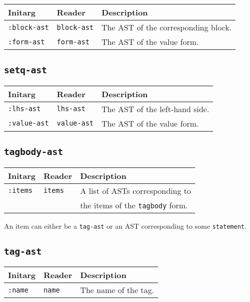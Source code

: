 \begin{tabular}{|l|l|l|}
\hline
Initarg & Reader & Description\\
\hline\hline
\texttt{:block-ast} & \texttt{block-ast} & The AST of the
corresponding block.\\
\hline
\texttt{:form-ast} & \texttt{form-ast} & The AST of the value form.\\
\hline
\end{tabular}

\subsection{\texttt{setq-ast}}
\label{setq-ast}

\begin{tabular}{|l|l|l|}
\hline
Initarg & Reader & Description\\
\hline\hline
\texttt{:lhs-ast} & \texttt{lhs-ast} & The AST of the left-hand side.\\
\hline
\texttt{:value-ast} & \texttt{value-ast} & The AST of the value form.\\
\hline
\end{tabular}


\subsection{\texttt{tagbody-ast}}
\label{tagbody-ast}

\begin{tabular}{|l|l|l|}
\hline
Initarg & Reader & Description\\
\hline\hline
\texttt{:items} & \texttt{items} & A list of ASTs corresponding to\\
& & the items of the \texttt{tagbody} form. \\
\hline
\end{tabular}

An item can either be a \texttt{tag-ast} or an AST corresponding to
some \texttt{statement}. 

\subsection{\texttt{tag-ast}}
\label{tag-ast}

\begin{tabular}{|l|l|l|}
\hline
Initarg & Reader & Description\\
\hline\hline
\texttt{:name} & \texttt{name} & The name of the tag.\\
\hline
\end{tabular}


